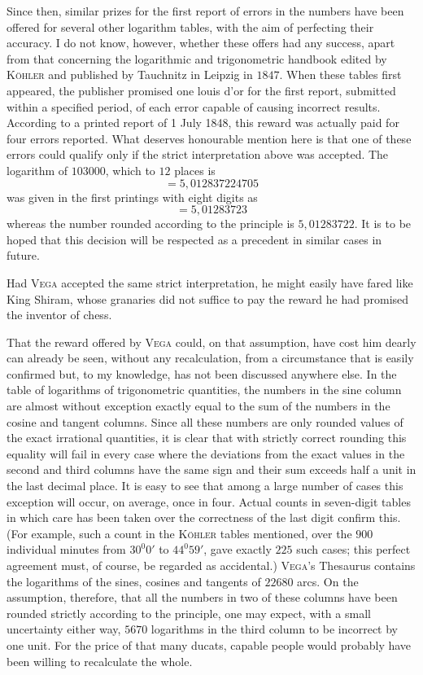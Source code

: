 Since then, similar prizes for the first report of errors in the numbers have been offered for several other logarithm tables, with the aim of perfecting their accuracy. I do not know, however, whether these offers had any success, apart from that concerning the logarithmic and trigonometric handbook edited by \textsc{Köhler} and published by Tauchnitz in Leipzig in $1847$. When these tables first appeared, the publisher promised one louis d'or for the first  report, submitted within a specified period, of each error capable of causing incorrect results. According to a printed report of 1 July 1848, this reward was actually paid for four errors reported. What deserves honourable mention here is that one of these errors could qualify only if the strict interpretation above was accepted. The logarithm of \(103000\), which to \(12\) places is
\[
=5{,}012837224705
\]
was given in the first printings with eight digits as
\[
=5{,}01283723
\]
whereas the number rounded according to the principle is \(5{,}01283722\). It is to be hoped that this decision will be respected as a precedent in similar cases in future.

Had \textsc{Vega} accepted the same strict interpretation, he might easily have fared like King Shiram, whose granaries did not suffice to pay the reward he had promised the inventor of chess.

That the reward offered by \textsc{Vega} could, on that assumption, have cost him dearly can already be seen, without any recalculation, from a circumstance that is easily confirmed but, to my knowledge, has not been discussed anywhere else. In the table of logarithms of trigonometric quantities, the numbers in the sine column are almost without exception exactly equal to the sum of the numbers in the cosine and tangent columns. Since all these numbers are only rounded values of the exact irrational quantities, it is clear that with strictly correct rounding this equality will fail in every case where the deviations from the exact values in the second and third columns have the same sign and their sum exceeds half a unit in the last decimal place. It is easy to see that among a large  number of cases this exception will occur, on average, once in four. Actual counts in seven-digit tables in which care has been taken over the correctness of the last digit confirm this. (For example, such a count in the \textsc{Köhler} tables mentioned, over the \(900\) individual minutes from \(30^{0}0'\) to \(44^{0}59'\), gave exactly \(225\) such cases; this perfect agreement must, of course, be regarded as accidental.) \textsc{Vega}'s Thesaurus contains the logarithms of the sines, cosines and tangents of \(22680\) arcs. On the assumption, therefore, that all the numbers in two of these columns have been rounded strictly according to the principle, one may expect, with a small uncertainty either way, \(5670\) logarithms in the third column to be incorrect by one unit. For the price of that many ducats, capable people would probably have been willing to recalculate the whole.

